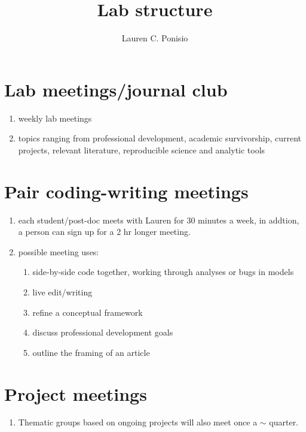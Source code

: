 \documentclass[12pt]{article}
\title{Lab structure}
\author{Lauren C. Ponisio}
\begin{document}
\maketitle

\section{Lab meetings/journal club}
\begin{enumerate}
\item weekly lab meetings
\item topics ranging from professional development, academic
  survivorship, current projects, relevant literature, reproducible
  science and analytic tools
\end{enumerate}

\section{Pair coding-writing meetings}
\begin{enumerate}
\item each student/post-doc meets with Lauren for 30 minutes a week,
  in addtion, a person can sign up for a 2 hr longer meeting.
\item possible meeting uses:
  \begin{enumerate}
  \item side-by-side code together, working through analyses or bugs
    in models
  \item live edit/writing
  \item refine a conceptual framework
  \item discuss professional development goals
  \item outline the framing of an article
  \end{enumerate}
\end{enumerate}

\section{Project meetings}
\begin{enumerate}
\item Thematic groups based on ongoing projects will also meet once a
  $\sim$ quarter.
\end{enumerate}
\end{document}
